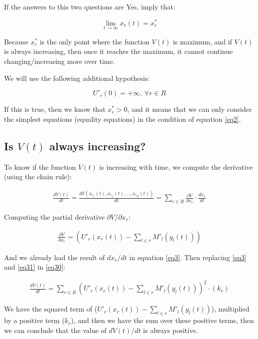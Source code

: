 If the answers to this two questions are Yes, imply that:

$$\lim_{t\to\infty} x_r(t) = x_r^*$$

Because $x_r^*$ is the only point where the function $V(t)$ is maximum, and if $V(t)$ is always increasing, then once it reaches the maximum, it cannot continue changing/increasing more over time.

We will use the following additional hypothesis:

$$U'_r(0) = +\infty,\ \forall r \in R$$

If this is true, then we know that $x_r^* > 0$, and it means that we can only consider the simplest equations (equality equations) in the condition of equation \eqref{eq2}.

\subsection{Is $V(t)$ always increasing?}
To know if the function $V(t)$ is increasing with time, we compute the derivative (using the chain rule):

\begin{equation}
\begin{aligned}
\frac{dV(t)}{dt} = \frac{dV(x_{r_1}(t), x_{r_2}(t), ... , x_{r_R}(t))}{dt}= \sum_{r \in R} \frac{\partial V}{\partial x_r} \cdot \frac{dx_r}{dt}
\end{aligned}
\label{eq30}
\end{equation}

Computing the partial derivative $\partial V/\partial x_r$:

\begin{equation}
\begin{aligned}
\frac{\partial V}{\partial x_r} = (U'_r(x_r(t)) - \sum_{l \in {r}} M'_l(y_l(t)))
\end{aligned}
\label{eq31}
\end{equation}

And we already had the result of $dx_r/dt$ in equation \eqref{eq3}. Then replacing \eqref{eq3} and \eqref{eq31} in \eqref{eq30}:

\begin{equation}
\begin{aligned}
\frac{dV(t)}{dt} = \sum_{r \in R} (U'_r(x_r(t)) - \sum_{l \in {r}} M'_l(y_l(t)))^2 \cdot (k_r)
\end{aligned}
\label{eq32}
\end{equation}

We have the squared term of ($U'_r(x_r(t)) - \sum_{l \in {r}} M'_l(y_l(t))$), multiplied by a positive term ($k_r$), and then we have the sum over these positive terms, then we can conclude that the value of $dV(t)/dt$ is always positive. 

